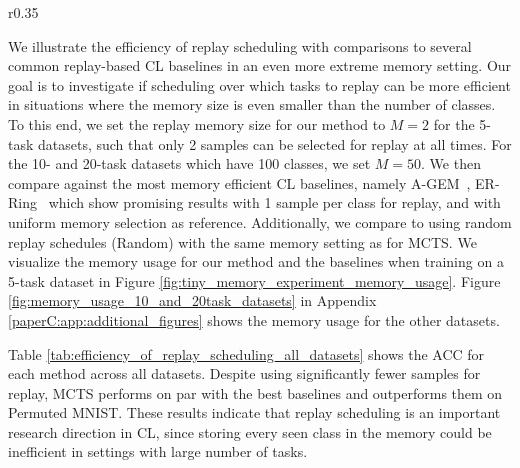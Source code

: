 \begin{wrapfigure}[12]{r}{0.35\textwidth}
	\centering
	\setlength{\figwidth}{0.33\textwidth}
	\setlength{\figheight}{.14\textheight}
	\vspace{-3mm}
	
	\vspace{-3mm}
	\captionsetup{width=.9\linewidth}
	\caption{
		Number of replayed samples/task for the 5-task datasets in the tiny memory setting. Ours use $M=2$ samples for replay, while the baselines increment their memory per task.
	}
	\label{fig:tiny_memory_experiment_memory_usage}
\end{wrapfigure}
We illustrate the efficiency of replay scheduling with comparisons to several common replay-based CL baselines in an even more extreme memory setting.
Our goal is to investigate if scheduling over which tasks to replay can be more efficient in situations where the memory size is even smaller than the number of classes. %
To this end, we set the replay memory size for our method
to $M=2$ for the 5-task datasets, such that only 2 samples can be selected for replay at all times. For the 10- and 20-task datasets which have 100 classes, we set $M=50$. We then compare against the most memory efficient CL baselines, namely A-GEM~, ER-Ring~ which show promising results with 1 sample per class for replay, %
and with uniform memory selection as reference. 
Additionally, we compare to using random replay schedules (Random) with the same memory setting as for MCTS.
We visualize the memory usage for our method and the baselines when training on a 5-task dataset in Figure \ref{fig:tiny_memory_experiment_memory_usage}. 
Figure \ref{fig:memory_usage_10_and_20task_datasets} in Appendix \ref{paperC:app:additional_figures} shows the memory usage for the other datasets. 

Table \ref{tab:efficiency_of_replay_scheduling_all_datasets} shows the ACC for each method across all datasets. Despite using significantly fewer samples for replay, MCTS performs on par with the best baselines and outperforms them on Permuted MNIST.  
These results indicate that replay scheduling is an important research direction in CL, since storing every seen class in the memory could be inefficient in settings with large number of tasks. 



